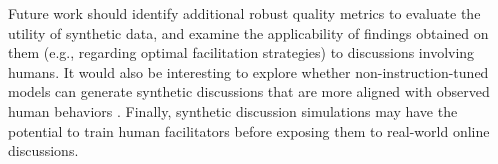%

Future work should identify additional robust quality metrics to evaluate the utility of synthetic data, and examine the applicability of findings obtained on  them (e.g., regarding optimal facilitation strategies) to discussions involving humans. It would also be interesting to explore whether non-instruction-tuned models can generate synthetic discussions that are more aligned with observed human behaviors \cite{anthis_2025}. Finally, synthetic discussion simulations may have the potential to train human facilitators before exposing them to real-world online discussions.